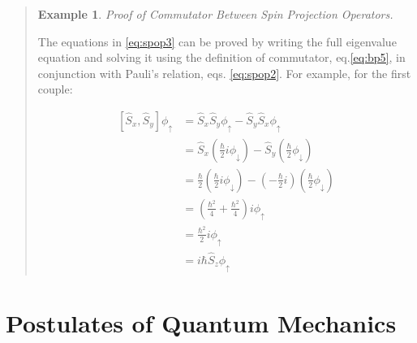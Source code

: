 \documentclass[
  9pt,
]{extbook}
\theoremstyle{definition}
\theoremstyle{definition}
\newtheorem{example}{Example}[chapter]
\theoremstyle{definition}
\theoremstyle{remark}
\begin{document}
\begin{quote}
\begin{example}
\protect\hypertarget{exm:spinex1}{}{\label{exm:spinex1} }\emph{Proof of Commutator Between Spin Projection Operators.}

The equations in \eqref{eq:spop3} can be proved by writing the full eigenvalue equation and solving it using the definition of commutator, eq.\eqref{eq:bp5}, in conjunction with Pauli's relation, eqs. \eqref{eq:spop2}. For example, for the first couple:

\begin{equation}
\begin{aligned}
\left[\hat{S}_x, \hat{S}_y\right] \phi_{\uparrow} &= \hat{S}_x\hat{S}_y\phi_{\uparrow}-\hat{S}_y\hat{S}_x\phi_{\uparrow} \\
&= \hat{S}_x \left(\frac{\hbar}{2}i \phi_{\downarrow} \right)-\hat{S}_y \left(\frac{\hbar}{2} \phi_{\downarrow} \right) \\
&= \frac{\hbar}{2} \left(\frac{\hbar}{2}i \phi_{\downarrow} \right)- \left(-\frac{\hbar}{2}i\right) \left(\frac{\hbar}{2} \phi_{\downarrow} \right) \\
&= \left(\frac{\hbar^2}{4}+\frac{\hbar^2}{4}\right)i\phi_{\uparrow} \\
&= \frac{\hbar^2}{2}i \phi_{\uparrow} \\
&= i\hbar\hat{S}_z  \phi_{\uparrow} 
\end{aligned}
\label{eq:spop4} 
\end{equation}
\end{example}
\end{quote}

\hypertarget{Postulates}{%
\chapter{Postulates of Quantum Mechanics}\label{Postulates}}
\end{document}
